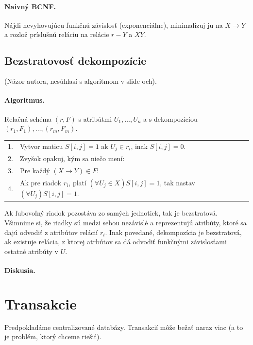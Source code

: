 \documentclass[10pt,a4paper]{article}
\begin{document}
\paragraph{Naivný BCNF.} Nájdi nevyhovujúcu funkčnú závislosť (exponenciálne), minimalizuj ju na $X \rightarrow Y$ a rozlož príslušnú reláciu na relácie $r-Y$ a $XY$. 

\subsection{Bezstratovosť dekompozície}
(Názor autora, nesúhlasí s algoritmom v slide-och). 

\paragraph{Algoritmus.}
Relačná schéma $(r,F)$ s atribútmi $U_1,\ldots,U_n$ a s dekompozíciou $(r_1, F_1),\ldots,(r_m, F_m)$.

\begin{tabular}{ll}
1. & Vytvor maticu $S[i,j] = 1$ ak $U_j \in r_i$, inak $S[i,j] = 0$.\\
2. & Zvyšok opakuj, kým sa niečo mení:\\
3. & Pre každý $(X \rightarrow Y) \in F$:\\
4. & Ak pre riadok $r_i$, platí $(\forall U_j \in X)S[i,j]=1$, tak nastav $(\forall U_j)S[i,j]=1$.\\
\end{tabular}

Ak ľubovoľný riadok pozostáva zo samých jednotiek, tak je bezstratová. Všimnime si, že riadky sú medzi sebou nezávislé a reprezentujú atribúty, ktoré sa dajú odvodiť z atribútov relácií $r_i$. 
Inak povedané, dekompozícia je bezstratová, ak existuje relácia, z ktorej atrbútov sa dá odvodiť funkčnými závislosťami ostatné atribúty v $U$. 

\paragraph{Diskusia.}
    
\section{Transakcie} 

Predpokladáme centralizované databázy. Transakcií môže bežať naraz viac (a to je problém, ktorý chceme riešiť).  
\end{document}
